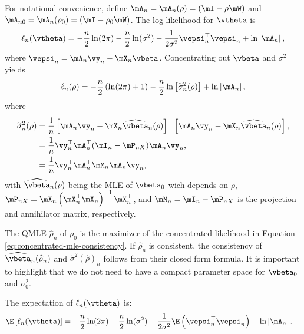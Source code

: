 \documentclass[english,12pt]{book}\usepackage[]{graphicx}\usepackage[]{xcolor}
\begin{document}
\begin{subappendices}
For notational convenience, define $\mA_n = \mA_n(\rho) = (\mI - \rho\mW)$ and $\mA_{n0} = \mA_n(\rho_0) = (\mI - \rho_0\mW)$. The log-likelihood for $\vtheta$ is 
\begin{equation*}
\ell_n(\vtheta) = -\frac{n}{2}\ln (2\pi) - \frac{n}{2}\ln(\sigma^2) - \frac{1}{2\sigma^2}\vepsi_n^\top\vepsi_n + \ln\left|\mA_n\right|,
\end{equation*}
%
where $\vepsi_n = \mA_n\vy_n - \mX_n\vbeta$. Concentrating out $\vbeta$ and $\sigma^2$ yields
\begin{equation}\label{eq:concentrated-mle-consistency}
 \ell_n(\rho) =-\frac{n}{2}\left(\ln(2\pi) + 1\right) - \frac{n}{2}\ln\left[\widetilde{\sigma}^2_n(\rho)\right] + \ln\left|\mA_n\right|,
\end{equation}
%
where
\begin{equation}\label{eq:sigma-mle-consistency}
\begin{aligned}
\widetilde{\sigma}^2_n(\rho) & = \frac{1}{n}\left[\mA_n\vy_n - \mX_n\widehat{\vbeta}_n(\rho)\right]^\top \left[\mA_n\vy_n - \mX_n\widehat{\vbeta}_n(\rho)\right],  \\
& = \frac{1}{n}\vy_n^\top\mA_n^\top(\mI_n - \mP_{nX})\mA_n\vy_n, \\
& = \frac{1}{n}\vy_n^\top\mA_n^\top\mM_n\mA_n\vy_n,
\end{aligned}
\end{equation}
%
with $\widehat{\vbeta}_n(\rho)$ being the MLE of $\vbeta_0$ wich depends on $\rho$, $\mP_{nX} = \mX_n\left(\mX_n^\top\mX_n\right)^{-1}\mX_n^\top$, and $\mM_n = \mI_n - \mP_{nX}$ is the projection and annihilator matrix, respectively.

The QMLE $\widehat{\rho}_n$ of $\rho_0$ is the maximizer of the concentrated likelihood in Equation \eqref{eq:concentrated-mle-consistency}. If $\widehat{\rho}_n$ is consistent, the consistency of $\widehat{\vbeta}_n(\widehat{\rho}_n)$ and $\widetilde{\sigma}^2(\widehat{\rho})_n$ follows from their closed form formula. It is important to highlight that we do not need to have a compact parameter space for $\vbeta_0$ and $\sigma_0^2$.

The expectation of $\ell_n(\vtheta)$ is:
\begin{equation}\label{eq:expectation-log-slm}
  \begin{aligned}
    \E\left[\ell_n(\vtheta)\right] & = -\frac{n}{2}\ln (2\pi) - \frac{n}{2}\ln(\sigma^2) - \frac{1}{2\sigma^2}\E\left(\vepsi_n^\top\vepsi_n\right) + \ln\left|\mA_n\right|.
  \end{aligned}
\end{equation}


\end{subappendices}
\end{document}
